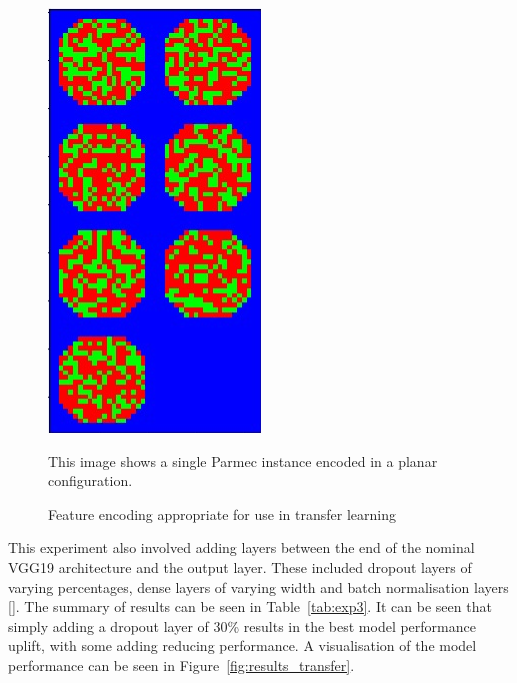 \begin{figure}[h]
	\centering
	\includegraphics[scale=0.75]{Figures/vgg_encoding.png}
	\caption{Feature encoding appropriate for use in transfer learning} {This image shows a single Parmec instance encoded in a planar configuration.}
	\label{fig:transfer_encoding}
\end{figure}

\noindent
This experiment also involved adding layers between the end of the nominal VGG19 architecture and the output layer. These included dropout layers of varying percentages, dense layers of varying width and batch normalisation layers [\cite{liao2016importance}]. The summary of results can be seen in Table~\ref{tab:exp3}. It can be seen that simply adding a dropout layer of 30\% results in the best model performance uplift, with some adding reducing performance. A visualisation of the model performance can be seen in Figure~\ref{fig:results_transfer}. 

